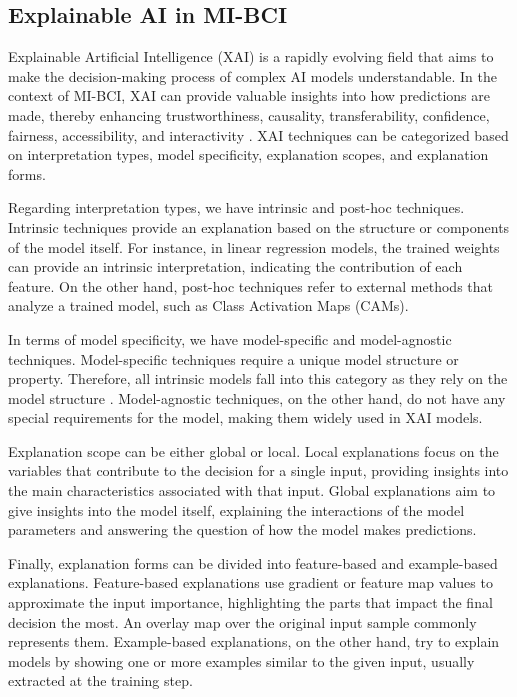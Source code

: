 \subsection{Explainable AI in MI-BCI}

Explainable Artificial Intelligence (XAI) is a rapidly evolving field that aims to make the decision-making process of complex AI models understandable. In the context of MI-BCI, XAI can provide valuable insights into how predictions are made, thereby enhancing trustworthiness, causality, transferability, confidence, fairness, accessibility, and interactivity \cite{arrieta2020explainable}. XAI techniques can be categorized based on interpretation types, model specificity, explanation scopes, and explanation forms. 

Regarding interpretation types, we have intrinsic and post-hoc techniques. Intrinsic techniques provide an explanation based on the structure or components of the model itself. For instance, in linear regression models, the trained weights can provide an intrinsic interpretation, indicating the contribution of each feature. On the other hand, post-hoc techniques refer to external methods that analyze a trained model, such as Class Activation Maps (CAMs).

In terms of model specificity, we have model-specific and model-agnostic techniques. Model-specific techniques require a unique model structure or property. Therefore, all intrinsic models fall into this category as they rely on the model structure \cite{tjoa2020survey}. Model-agnostic techniques, on the other hand, do not have any special requirements for the model, making them widely used in XAI models.

Explanation scope can be either global or local. Local explanations focus on the variables that contribute to the decision for a single input, providing insights into the main characteristics associated with that input. Global explanations aim to give insights into the model itself, explaining the interactions of the model parameters and answering the question of how the model makes predictions.

Finally, explanation forms can be divided into feature-based and example-based explanations. Feature-based explanations use gradient or feature map values to approximate the input importance, highlighting the parts that impact the final decision the most. An overlay map over the original input sample commonly represents them. Example-based explanations, on the other hand, try to explain models by showing one or more examples similar to the given input, usually extracted at the training step.

